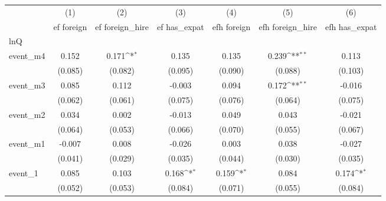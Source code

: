 {
\def\sym#1{\ifmmode^{#1}\else\(^{#1}\)\fi}
\begin{tabular}{l*{6}{c}}
\hline\hline
            &\multicolumn{1}{c}{(1)}&\multicolumn{1}{c}{(2)}&\multicolumn{1}{c}{(3)}&\multicolumn{1}{c}{(4)}&\multicolumn{1}{c}{(5)}&\multicolumn{1}{c}{(6)}\\
            &\multicolumn{1}{c}{ef foreign}&\multicolumn{1}{c}{ef foreign\_hire}&\multicolumn{1}{c}{ef has\_expat}&\multicolumn{1}{c}{efh foreign}&\multicolumn{1}{c}{efh foreign\_hire}&\multicolumn{1}{c}{efh has\_expat}\\
\hline
lnQ         &                     &                     &                     &                     &                     &                     \\
event\_m4    &       0.152         &       0.171\sym{*}  &       0.135         &       0.135         &       0.239\sym{**} &       0.113         \\
            &     (0.085)         &     (0.082)         &     (0.095)         &     (0.090)         &     (0.088)         &     (0.103)         \\
[1em]
event\_m3    &       0.085         &       0.112         &      -0.003         &       0.094         &       0.172\sym{**} &      -0.016         \\
            &     (0.062)         &     (0.061)         &     (0.075)         &     (0.076)         &     (0.064)         &     (0.075)         \\
[1em]
event\_m2    &       0.034         &       0.002         &      -0.013         &       0.049         &       0.043         &      -0.021         \\
            &     (0.064)         &     (0.053)         &     (0.066)         &     (0.070)         &     (0.055)         &     (0.067)         \\
[1em]
event\_m1    &      -0.007         &       0.008         &      -0.026         &       0.003         &       0.038         &      -0.027         \\
            &     (0.041)         &     (0.029)         &     (0.035)         &     (0.044)         &     (0.030)         &     (0.035)         \\
[1em]
event\_1     &       0.085         &       0.103         &       0.168\sym{*}  &       0.159\sym{*}  &       0.084         &       0.174\sym{*}  \\
            &     (0.052)         &     (0.053)         &     (0.084)         &     (0.071)         &     (0.055)         &     (0.084)         \\

\end{tabular}}
